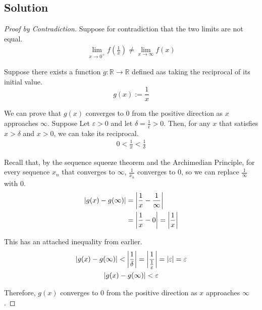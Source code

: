 \documentclass[12pt]{report}
\begin{document}
    \subsection{Solution}
    \begin{proof}[Proof by Contradiction]
        Suppose for contradiction that the two limits are not equal.
        \begin{gather}
            \lim_{x \to 0^+} f\left( \frac{1}{x} \right) \neq \lim_{x \to \infty} f(x)
        \end{gather}

        Suppose there exists a function $g: \mathbb{R} \to \mathbb{R}$ defined aas taking the reciprocal of its initial value.
        \begin{equation}
            g(x) := \frac{1}{x}
        \end{equation}

        We can prove that $g(x)$ converges to $0$ from the positive direction as $x$ approaches $\infty$.
        Suppose Let $\varepsilon > 0$ and let $\delta = \frac{1}{\epsilon} > 0$.
        Then, for any $x$ that satisfies $x > \delta$ and $x > 0$, we can take its reciprocal.
        \begin{gather}
            0 < \frac{1}{x} < \frac{1}{\delta}
        \end{gather}
        
        Recall that, by the sequence squeeze theorem and the Archimedian Principle, for every sequence $x_n$ that converges to $\infty$, $\frac{1}{x_n}$ converges to $0$, so we can replace $\frac{1}{\infty}$ with $0$.
        \begin{align}
            \left| g(x) - g(\infty) \right|   &=  \left| \frac{1}{x} - \frac{1}{\infty} \right|\\
                &=  \left| \frac{1}{x} - 0 \right|
                =   \left| \frac{1}{x} \right|
        \end{align}
        
        This has an attached inequality from earlier.
        \begin{gather}
            \left| g(x) - g(\infty) \right|  <  \left| \frac{1}{\delta} \right|
                =   \left| \frac{1}{\frac{1}{\varepsilon}} \right|
                =   \left| \varepsilon \right|
                =   \varepsilon\\
            \left| g(x) - g(\infty) \right| < \varepsilon
        \end{gather}

        Therefore, $g(x)$ converges to $0$ from the positive direction as $x$ approaches $\infty$.


\end{proof}
\end{document}
